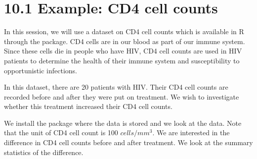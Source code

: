 \documentclass[letterpaper,10pt,english]{jupyterBook}
\begin{document}
\section{10.1 Example: CD4 cell counts}
\label{\detokenize{10.b. Bayesian Statistics II:example-cd4-cell-counts}}\label{\detokenize{10.b. Bayesian Statistics II::doc}}
\sphinxAtStartPar
In this session, we will use a dataset on CD4 cell counts which is available in R through the  package. CD4 cells are in our blood as part of our immune system. Since these cells die in people who have HIV, CD4 cell counts are used in HIV patients to determine the health of their immune system and susceptibility to opportunistic infections.

\sphinxAtStartPar
In this dataset, there are 20 patients with HIV. Their CD4 cell counts are recorded before and after they were put on treatment. We wish to investigate whether this treatment increased their CD4 cell counts.

\sphinxAtStartPar
We install the  package where the data is stored and we look at the data. Note that the unit of CD4 cell count is 100 \(cells/mm^3\). We are interested in the difference in CD4 cell counts before and after treatment. We look at the summary statistics of the difference.
\end{document}
